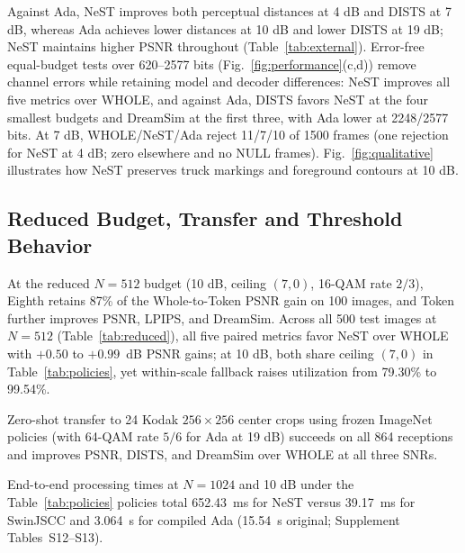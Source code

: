 Against Ada, NeST improves both perceptual distances at 4 dB and DISTS at 7 dB, whereas Ada achieves lower distances at 10 dB and lower DISTS at 19 dB; NeST maintains higher PSNR throughout (Table~\ref{tab:external}). Error-free equal-budget tests over 620--2577 bits (Fig.~\ref{fig:performance}(c,d)) remove channel errors while retaining model and decoder differences: NeST improves all five metrics over WHOLE, and against Ada, DISTS favors NeST at the four smallest budgets and DreamSim at the first three, with Ada lower at 2248/2577 bits. At 7 dB, WHOLE/NeST/Ada reject 11/7/10 of 1500 frames (one rejection for NeST at 4 dB; zero elsewhere and no NULL frames). Fig.~\ref{fig:qualitative} illustrates how NeST preserves truck markings and foreground contours at 10 dB.

\subsection{Reduced Budget, Transfer and Threshold Behavior}


At the reduced $N=512$ budget (10 dB, ceiling $(7,0)$, 16-QAM rate $2/3$), Eighth retains 87\% of the Whole-to-Token PSNR gain on 100 images, and Token further improves PSNR, LPIPS, and DreamSim. Across all 500 test images at $N=512$ (Table~\ref{tab:reduced}), all five paired metrics favor NeST over WHOLE with $+0.50$ to $+0.99$~dB PSNR gains; at 10 dB, both share ceiling $(7,0)$ in Table~\ref{tab:policies}, yet within-scale fallback raises utilization from 79.30\% to 99.54\%.

Zero-shot transfer to 24 Kodak $256\times256$ center crops using frozen ImageNet policies (with 64-QAM rate $5/6$ for Ada at 19 dB) succeeds on all 864 receptions and improves PSNR, DISTS, and DreamSim over WHOLE at all three SNRs.



End-to-end processing times at $N=1024$ and 10 dB under the Table~\ref{tab:policies} policies total 652.43~ms for NeST versus 39.17~ms for SwinJSCC and 3.064~s for compiled Ada (15.54~s original; Supplement Tables~S12--S13).
